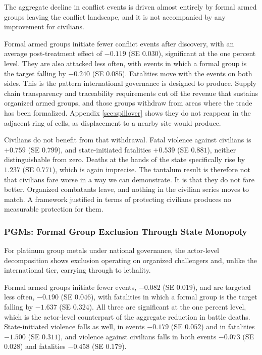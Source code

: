 \documentclass[11pt]{article}
\begin{document}
The aggregate decline in conflict events is driven almost entirely by formal armed groups leaving the conflict landscape, and it is not accompanied by any improvement for civilians.

Formal armed groups initiate fewer conflict events after discovery, with an average post-treatment effect of $-0.119$ (SE $0.030$), significant at the one percent level. They are also attacked less often, with events in which a formal group is the target falling by $-0.240$ (SE $0.085$). Fatalities move with the events on both sides. This is the pattern international governance is designed to produce. Supply chain transparency and traceability requirements cut off the revenue that sustains organized armed groups, and those groups withdraw from areas where the trade has been formalized. Appendix \ref{sec:spillover} shows they do not reappear in the adjacent ring of cells, as displacement to a nearby site would produce.

Civilians do not benefit from that withdrawal. Fatal violence against civilians is $+0.759$ (SE $0.799$), and state-initiated fatalities $+0.539$ (SE $0.881$), neither distinguishable from zero. Deaths at the hands of the state specifically rise by $1.237$ (SE $0.771$), which is again imprecise. The tantalum result is therefore not that civilians fare worse in a way we can demonstrate. It is that they do not fare better. Organized combatants leave, and nothing in the civilian series moves to match. A framework justified in terms of protecting civilians produces no measurable protection for them.

\subsubsection{PGMs: Formal Group Exclusion Through State Monopoly}

For platinum group metals under national governance, the actor-level decomposition shows exclusion operating on organized challengers and, unlike the international tier, carrying through to lethality.

Formal armed groups initiate fewer events, $-0.082$ (SE $0.019$), and are targeted less often, $-0.190$ (SE $0.046$), with fatalities in which a formal group is the target falling by $-1.637$ (SE $0.324$). All three are significant at the one percent level, which is the actor-level counterpart of the aggregate reduction in battle deaths. State-initiated violence falls as well, in events $-0.179$ (SE $0.052$) and in fatalities $-1.500$ (SE $0.311$), and violence against civilians falls in both events $-0.073$ (SE $0.028$) and fatalities $-0.458$ (SE $0.179$).
\end{document}

